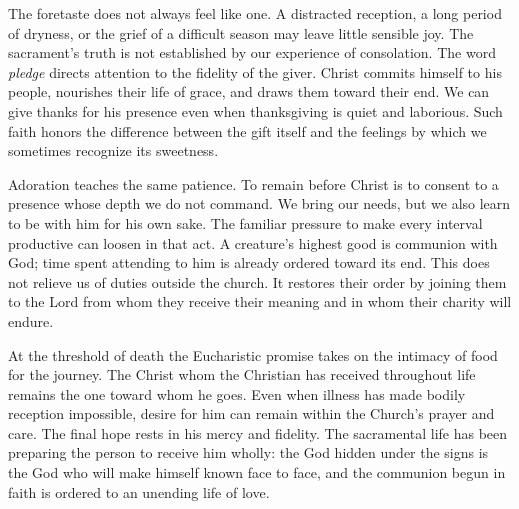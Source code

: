 The foretaste does not always feel like one. A distracted reception, a long period of dryness, or the grief of a difficult season may leave little sensible joy. The sacrament's truth is not established by our experience of consolation. The word \emph{pledge} directs attention to the fidelity of the giver. Christ commits himself to his people, nourishes their life of grace, and draws them toward their end. We can give thanks for his presence even when thanksgiving is quiet and laborious. Such faith honors the difference between the gift itself and the feelings by which we sometimes recognize its sweetness.

Adoration teaches the same patience. To remain before Christ is to consent to a presence whose depth we do not command. We bring our needs, but we also learn to be with him for his own sake. The familiar pressure to make every interval productive can loosen in that act. A creature's highest good is communion with God; time spent attending to him is already ordered toward its end. This does not relieve us of duties outside the church. It restores their order by joining them to the Lord from whom they receive their meaning and in whom their charity will endure.

At the threshold of death the Eucharistic promise takes on the intimacy of food for the journey. The Christ whom the Christian has received throughout life remains the one toward whom he goes. Even when illness has made bodily reception impossible, desire for him can remain within the Church's prayer and care. The final hope rests in his mercy and fidelity. The sacramental life has been preparing the person to receive him wholly: the God hidden under the signs is the God who will make himself known face to face, and the communion begun in faith is ordered to an unending life of love.

